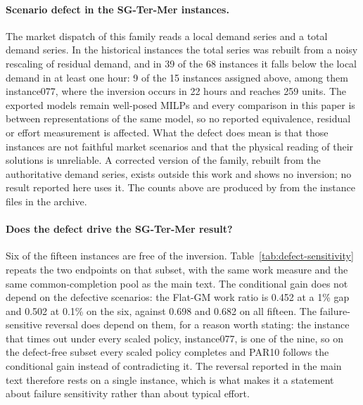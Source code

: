 \documentclass[11pt]{article}
\begin{document}
\paragraph{Scenario defect in the SG-Ter-Mer instances.}
The market dispatch of this family reads a local demand series and a total demand series. In
the historical instances the total series was rebuilt from a noisy rescaling of residual
demand, and in 39 of the 68 instances it falls below the local demand in at least one hour: 9
of the 15 instances assigned above, among them instance077, where the inversion occurs in 22
hours and reaches 259 units. The exported models remain well-posed MILPs and every comparison
in this paper is between representations of the same model, so no reported equivalence,
residual or effort measurement is affected. What the defect does mean is that those instances
are not faithful market scenarios and that the physical reading of their solutions is
unreliable. A corrected version of the family, rebuilt from the authoritative demand series,
exists outside this work and shows no inversion; no result reported here uses it. The counts
above are produced by  from the instance files in
the archive.

\paragraph{Does the defect drive the SG-Ter-Mer result?}
Six of the fifteen instances are free of the inversion. Table~\ref{tab:defect-sensitivity} repeats
the two endpoints on that subset, with the same work measure and the same common-completion
pool as the main text. The conditional gain does not depend on the defective scenarios: the
Flat-GM work ratio is 0.452 at a 1\% gap and 0.502 at 0.1\% on the six, against 0.698 and 0.682
on all fifteen. The failure-sensitive reversal does depend on them, for a reason worth stating:
the instance that times out under every scaled policy, instance077, is one of the nine, so on
the defect-free subset every scaled policy completes and PAR10 follows the conditional gain
instead of contradicting it. The reversal reported in the main text therefore rests on a single
instance, which is what makes it a statement about failure sensitivity rather than about
typical effort.

\begin{table}[tb]
\centering\small
\caption{SG-Ter-Mer reconstruction on all fifteen assigned instances and on the six without the
demand inversion. Work ratios are geometric means against Base on the instances every policy
completed; PAR10 is the arithmetic mean over the assigned pool, with 18,000 seconds for a
non-completion.}
\label{tab:defect-sensitivity}

\end{table}
\end{document}
